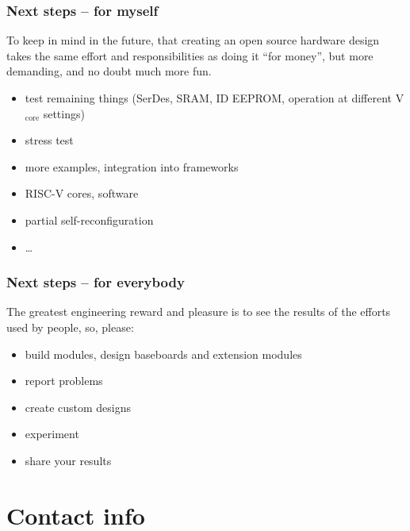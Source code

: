 \begin{frame}
  \frametitle{Next steps -- for myself}

  To keep in mind in the future, that creating an open source hardware
  design takes the same effort and responsibilities as doing it ``for
  money'', but more demanding, and no doubt much more fun.

  \vspace{.5cm}

  \begin{itemize}
  \item test remaining things (SerDes, SRAM, ID EEPROM,
  operation at different V$_{\text{core}}$ settings)
  \item stress test
  \item more examples, integration into frameworks
  \item RISC-V cores, software
  \item partial self-reconfiguration
  \item \dots
  \end{itemize}
\end{frame}

\begin{frame}
  \frametitle{Next steps -- for everybody}

  The greatest engineering reward and pleasure is to see the results
  of the efforts used by people, so, please:

  \vspace{.5cm}

  \begin{itemize}
  \item build modules, design baseboards and extension modules
  \item report problems
  \item create custom designs
  \item experiment
  \item share your results
  \end{itemize}

  \vspace{-2cm}
  \begin{flushright}
    
  \end{flushright}

\end{frame}

\section{Contact info}



